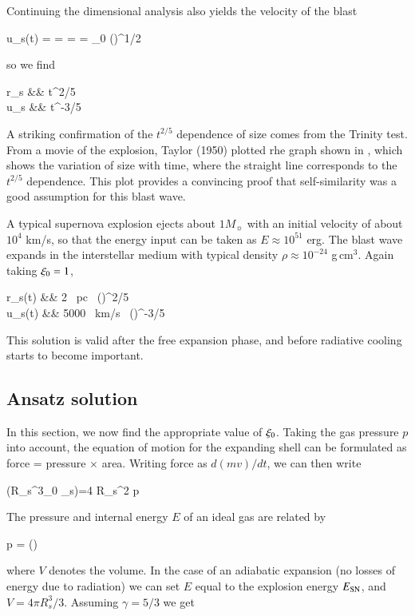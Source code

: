 Continuing the dimensional analysis also yields the velocity of the
blast 

\beq
u_s(t) = = =  =
\ksi_0 \left(\right)^{1/2}
\eeq

so we find

\beqn
r_s &\propto& t^{2/5}\\
u_s &\propto& t^{-3/5}
\eeqn

A striking confirmation of the
$t^{2/5}$ dependence of size comes from the Trinity test. From a movie
of the explosion, Taylor (1950) plotted rhe graph shown in
, which shows
the variation of size with time, where the straight line corresponds to
the $t^{2/5}$ dependence. This plot provides a convincing proof that
self-similarity was a good assumption for this blast wave.

A typical supernova explosion ejects about $1M_\sun$ with an initial
velocity of about $10^4$ km/s, so that the energy input can be taken as
$E \approx 10^{51}$ erg. The blast wave expands in the interstellar medium with
typical density $\rho \approx 10^{-24}$ g\,cm$^3$. Again taking
$\xi_0=1$, 

\beqn
r_s(t) &\approx& 2 \ {\rm pc} \ \left(\right)^{2/5} \\
u_s(t) &\approx& 5000 \ {\rm km/s} \ \left(\right)^{-3/5} 
\eeqn

This solution is valid after the free expansion phase, and before
radiative cooling starts to become important. 


\subsection{Ansatz solution}

In this section, we now find the appropriate value of $\xi_0$. Taking
the gas pressure $p$ into account, the equation of motion for the expanding shell can be
formulated as force = pressure $\times$ area. Writing force as
$d(mv)/dt$, we can then write 

\beq
{}\left(R_s^3\rho_0 _s\right)=4\pi
R_s^2 p
\label{eq:radius-evolution}
\eeq

The pressure and internal energy $E$ of an ideal gas are related by

\beq
p  = \left(\right) 
\eeq

\noindent where $V$ denotes the volume. In the case of an adiabatic expansion (no losses of energy
due to radiation) we can set $E$ equal to the explosion energy $E_{\rm
  SN}$, and $V = 4\pi R^3_s /3$. Assuming $\gamma = 5/3$ we get

